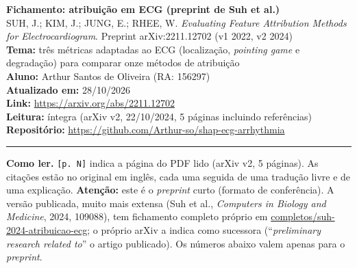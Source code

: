\documentclass[11pt,a4paper]{article}
\begin{document}
\begin{center}
    {\LARGE \textbf{Fichamento: atribuição em ECG (preprint de Suh et al.)}} \\[0.35em]
    {\large SUH, J.; KIM, J.; JUNG, E.; RHEE, W. \textit{Evaluating Feature Attribution Methods for Electrocardiogram}. Preprint arXiv:2211.12702 (v1 2022, v2 2024)} \\[0.3em]
    \textbf{Tema:} três métricas adaptadas ao ECG (localização, \textit{pointing game} e degradação) para comparar onze métodos de atribuição \\[0.2em]
    \textbf{Aluno:} Arthur Santos de Oliveira (RA: 156297) \\[0.2em]
    \textbf{Atualizado em:} 28/10/2026 \\[0.2em]
    \textbf{Link:} \url{https://arxiv.org/abs/2211.12702} \\[0.2em]
    \textbf{Leitura:} íntegra (arXiv v2, 22/10/2024, 5 páginas incluindo referências) \\[0.2em]
    \textbf{Repositório:} \url{https://github.com/Arthur-so/shap-ecg-arrhythmia}
\end{center}
\vspace{-0.5em}
\hrule
\vspace{0.8em}

\textbf{Como ler.} \texttt{[p. N]} indica a página do PDF lido (arXiv v2, 5 páginas). As citações estão no original em inglês, cada uma seguida de uma tradução livre e de uma explicação. \textbf{Atenção:} este é o \textit{preprint} curto (formato de conferência). A versão publicada, muito mais extensa (Suh et al., \textit{Computers in Biology and Medicine}, 2024, 109088), tem fichamento completo próprio em \url{completos/suh-2024-atribuicao-ecg}; o próprio arXiv a indica como sucessora (“\textit{preliminary research related to}” o artigo publicado). Os números abaixo valem apenas para o \textit{preprint}.
\end{document}
